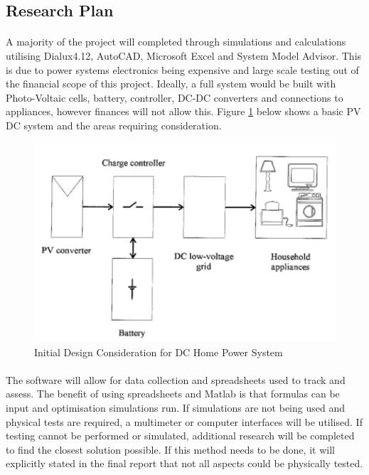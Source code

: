 \subsection{Research Plan}

\paragraph{}
A majority of the project will completed through simulations and calculations utilising Dialux4.12, AutoCAD, Microsoft Excel and System Model Advisor. This is due to power systems electronics being expensive and large scale testing out of the financial scope of this project. Ideally, a full system would be built with Photo-Voltaic cells, battery, controller, DC-DC converters and connections to appliances, however finances will not allow this. Figure \ref{fig:DCHomeSystem} below shows a basic PV DC system and the areas requiring consideration. 

\begin{figure}[H]
\hfill\includegraphics[width = 120mm]{images/DC_Home}\hspace*{\fill}
\caption{Initial Design Consideration for DC Home Power System \cite{Pellis1997}} 
\label{fig:DCHomeSystem}
\end{figure} 

\paragraph{} 
The software will allow for data collection and spreadsheets used to track and assess. The benefit of using spreadsheets and Matlab is that formulas can be input and optimisation simulations run. If simulations are not being used and physical tests are required, a multimeter or computer interfaces will be utilised. If testing cannot be performed or simulated, additional research will be completed to find the closest solution possible. If this method needs to be done, it will explicitly stated in the final report that not all aspects could be physically tested.     

